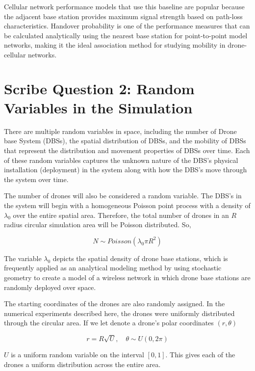 \documentclass[12pt,a4paper]{article}
\begin{document}
Cellular network performance models that use this baseline are popular because the adjacent base station provides maximum signal strength based on path-loss characteristics. Handover probability is one of the performance measures that can be calculated analytically using the nearest base station for point-to-point model networks, making it the ideal association method for studying mobility in drone-cellular networks.


\section{Scribe Question 2: Random Variables in the Simulation}

There are multiple random variables in space, including the number of Drone base System (DBSs), the spatial distribution of DBSs, and the mobility of DBSs that represent the distribution and movement properties of DBSs over time. Each of these random variables captures the unknown nature of the DBS's physical installation (deployment) in the system along with how the DBS's move through the system over time.

The number of drones will also be considered a random variable. The DBS's in the system will begin with a homogeneous Poisson point process with a density of $\lambda_0$ over the entire spatial area. Therefore, the total number of drones in an $R$ radius circular simulation area will be Poisson distributed. So,

\[
N \sim Poisson(\lambda_0 \pi R^2)
\]

The variable $\lambda_0$ depicts the spatial density of drone base stations, which is frequently applied as an analytical modeling method by using stochastic geometry to create a model of a wireless network in which drone base stations are randomly deployed over space.

The starting coordinates of the drones are also randomly assigned. In the numerical experiments described here, the drones were uniformly distributed through the circular area. If we let denote a drone’s polar coordinates $(r,\theta)$

\[
r = R\sqrt{U}, \quad \theta \sim U(0,2\pi)
\]

$U$ is a uniform random variable on the interval $[0,1]$. This gives each of the drones a uniform distribution across the entire area.
\end{document}
